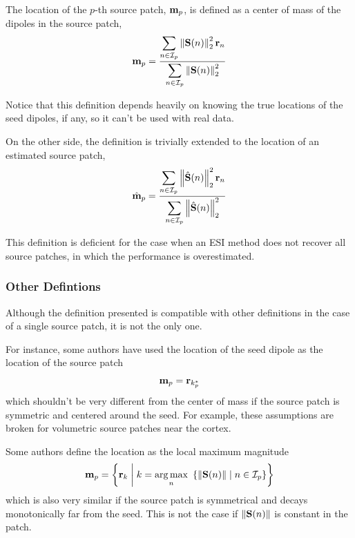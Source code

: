 The location of the $p$-th source patch, $\mathbf{m}_p$, is defined as a center of mass of the dipoles in the source patch,
\begin{equation}
    \mathbf{m}_p = 
\frac{\displaystyle \sum_{n\in \mathcal{I}_p} \left\lVert {\mathbf{S}}(n) \right\rVert_2^2 \mathbf{r}_n }{\displaystyle \sum_{n\in \mathcal{I}_p} \left\lVert {\mathbf{S}}(n) \right\rVert_2^2}
\end{equation}

Notice that this definition depends heavily on knowing the true locations of the seed dipoles, if any, so it can't be used with real data.

On the other side, the definition is trivially extended to the location of an estimated source patch,
\begin{equation}
    \hat{\mathbf{m}}_p = 
\frac{\displaystyle \sum_{n\in \mathcal{I}_p} \left\lVert \hat{\mathbf{S}}(n) \right\rVert_2^2 \mathbf{r}_n }{\displaystyle \sum_{n\in \mathcal{I}_p} \left\lVert \hat{\mathbf{S}}(n) \right\rVert_2^2}
\end{equation}

This definition is deficient for the case when an ESI method does not recover all source patches, in which the performance is overestimated.

\subsubsection{Other Defintions}

Although the definition presented is compatible with other definitions in the case of a single source patch, it is not the only one.

For instance, some authors have used the location of the seed dipole as the location of the source patch
\begin{equation}
    {\mathbf{m}}_p = \mathbf{r}_{k_p^*}
\end{equation}
which shouldn't be very different from the center of mass if the source patch is symmetric and centered around the seed.
%
For example, these assumptions are broken for volumetric source patches near the cortex.

Some authors define the location as the local maximum magnitude
\begin{equation}
    {\mathbf{m}}_p = \left\{ \mathbf{r}_k \;\middle|\; k = \operatorname*{arg\,max}_n\,\,
    \left\{ \left\lVert \mathbf{S}(n) \right\rVert \;\middle|\; n\in \mathcal{I}_p  \right\}
     \right\}
\end{equation}
which is also very similar if the source patch is symmetrical and decays monotonically far from the seed.
%
This is not the case if $\left\lVert \mathbf{S}(n) \right\rVert$ is constant in the patch.

